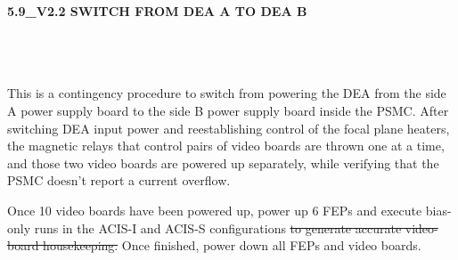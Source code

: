 \documentclass[11pt]{article}
\begin{document}
\newcommand{\be}{\begin{enumerate}}
\newcommand{\ee}{\end{enumerate}}
\newcommand{\bc}{\begin{center}}
\newcommand{\ec}{\end{center}}
\newcommand{\bi}{\begin{itemize}}
\newcommand{\ei}{\end{itemize}}
\newcommand{\bd}{\begin{description}}
\newcommand{\ed}{\end{description}}
\newcommand{\bt}{\begin{tabbing}}
\newcommand{\et}{\end{tabbing}}
\newcommand{\eg}{{\it e.g.~}}
\newcommand{\ie}{{\it i.e.~}}
\newcommand{\ul}{\underline}
\newcommand{\axaf}{{\em AXAF}}
\def\la{\hbox{\rlap{$<$}\lower0.5ex\hbox{$\sim$}\ }}

\centerline{\large {\bf 5.9\_V2.2 SWITCH FROM DEA A TO DEA B }}
\vspace{0.25in}

\\
 \\


\\

This is a contingency procedure to switch from powering the DEA 
from the side A power supply board to the side B power supply board inside 
the PSMC. After switching DEA input power and reestablishing control of the
focal plane heaters, the magnetic relays that control pairs of video boards 
are thrown one at a time, and those two video boards are powered up separately,
while verifying that the PSMC doesn't report a current overflow.

Once 10 video boards have been powered up, power up 6 FEPs and execute bias-only 
runs in the ACIS-I and ACIS-S configurations {\color{red} \sout{to generate 
accurate video-board housekeeping.}} Once finished, power down all FEPs and 
video boards.

\vspace{0.15in}
\end{document}
